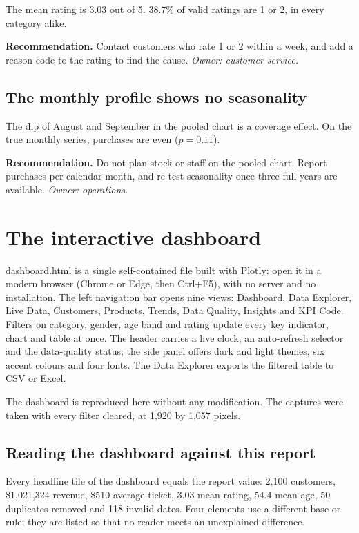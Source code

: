 \documentclass[12pt,a4paper]{article}
\newcommand{\F}[1]{{\small\url{#1}}}
\begin{document}
The mean rating is 3.03 out of 5. 38.7\% of valid ratings are 1 or 2, in every
category alike.

\textbf{Recommendation.} Contact customers who rate 1 or 2 within a week, and add a
reason code to the rating to find the cause. \emph{Owner: customer service.}

\subsection{The monthly profile shows no seasonality}

The dip of August and September in the pooled chart is a coverage effect. On the true
monthly series, purchases are even ($p = 0.11$).

\textbf{Recommendation.} Do not plan stock or staff on the pooled chart. Report
purchases per calendar month, and re-test seasonality once three full years are
available. \emph{Owner: operations.}

\section{The interactive dashboard}

\F{dashboard.html} is a single self-contained file built with Plotly: open it in a
modern browser (Chrome or Edge, then Ctrl+F5), with no server and no installation.
The left navigation bar opens nine views: Dashboard, Data Explorer, Live Data,
Customers, Products, Trends, Data Quality, Insights and KPI Code. Filters on category,
gender, age band and rating update every key indicator, chart and table at once. The
header carries a live clock, an auto-refresh selector and the data-quality status;
the side panel offers dark and light themes, six accent colours and four fonts. The
Data Explorer exports the filtered table to CSV or Excel.

The dashboard is reproduced here without any modification. The captures were taken
with every filter cleared, at 1{,}920 by 1{,}057 pixels.

\subsection{Reading the dashboard against this report}

Every headline tile of the dashboard equals the report value: 2{,}100 customers,
\$1{,}021{,}324 revenue, \$510 average ticket, 3.03 mean rating, 54.4 mean age,
50 duplicates removed and 118 invalid dates. Four elements use a different base or
rule; they are listed so that no reader meets an unexplained difference.
\end{document}
